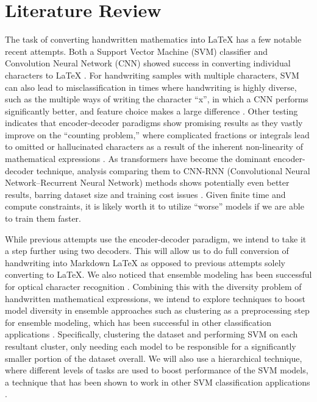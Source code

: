 \documentclass[11pt]{article}
\begin{document}
\section{Literature Review}

The task of converting handwritten mathematics into LaTeX has a few notable recent attempts. Both a Support Vector Machine (SVM) classifier and Convolution Neural Network (CNN) showed success in converting individual characters to LaTeX \citep{chang2016painfree}. For handwriting samples with multiple characters, SVM can also lead to misclassification in times where handwriting is highly diverse, such as the multiple ways of writing the character ``x'', in which a CNN performs significantly better, and feature choice makes a large difference \citep{schechter2017converting}. Other testing indicates that encoder-decoder paradigms show promising results as they vastly improve on the ``counting problem,'' where complicated fractions or integrals lead to omitted or hallucinated characters as a result of the inherent non-linearity of mathematical expressions \citep{wang2020recognizinghandwrittenmathematicalexpressions}. As transformers have become the dominant encoder-decoder technique, analysis comparing them to CNN-RNN (Convolutional Neural Network--Recurrent Neural Network) methods shows potentially even better results, barring dataset size and training cost issues \citep{sundararaj2024automatedlatexcodegeneration}. Given finite time and compute constraints, it is likely worth it to utilize ``worse'' models if we are able to train them faster.


While previous attempts use the encoder-decoder paradigm, we intend to take it a step further using two decoders. This will allow us to do full conversion of handwriting into Markdown LaTeX as opposed to previous attempts solely converting to LaTeX. We also noticed that ensemble modeling has been successful for optical character recognition \citep{preiss2025evaluationensemblelearningtechniques}.  Combining this with the diversity problem of handwritten mathematical expressions, we intend to explore techniques to boost model diversity in ensemble approaches such as clustering as a preprocessing step for ensemble modeling, which has been successful in other classification applications \citep{cui2021386}. Specifically, clustering the dataset and performing SVM on each resultant cluster, only needing each model to be responsible for a significantly smaller portion of the dataset overall. We will also use a hierarchical technique, where different levels of tasks are used to boost performance of the SVM models, a technique that has been shown to work in other SVM classification applications \citep{HAO2007627}.
\end{document}
